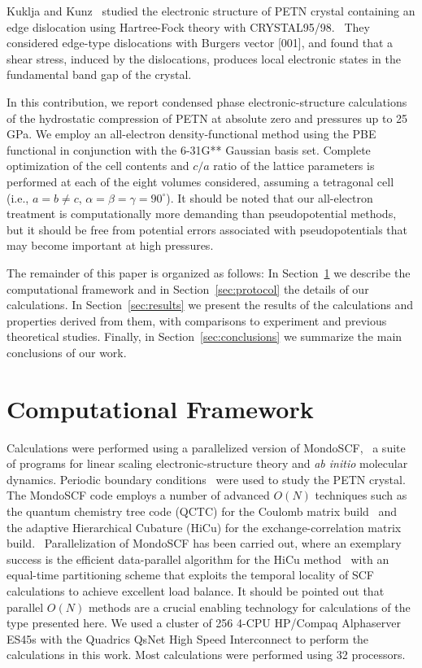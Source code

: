 \documentclass[prb,aps,nobibnotes,twocolumn,doublespace,twocolumngrid,superbib]{revtex4}
\begin{document}
Kuklja and Kunz~\cite{Kuklja_2001v89} studied the electronic structure 
of PETN crystal containing an edge dislocation using Hartree-Fock
theory with CRYSTAL95/98.~\cite{Crystal95} They considered
edge-type dislocations with Burgers vector [001], and 
found that a shear stress, induced by the dislocations, produces local 
electronic states in the fundamental band gap of the crystal.

In this contribution, we report condensed phase electronic-structure
calculations of the hydrostatic compression of PETN at absolute zero
and pressures up to 25 GPa.  We employ an all-electron
density-functional method using the PBE~\cite{Perdew_96v77} functional
in conjunction with the 6-31G** Gaussian basis set.  Complete
optimization of the cell contents and $c/a$ ratio of the lattice
parameters is performed at each of the eight volumes considered,
assuming a tetragonal cell (i.e., $a=b \neq c$,
$\alpha=\beta=\gamma=90^\circ$).  It should be noted that our
all-electron treatment is computationally more demanding than
pseudopotential methods, but it should be free from potential errors
associated with pseudopotentials that may become important at high
pressures.

The remainder of this paper is organized as follows: In
Section~\ref{sec:comput} we describe the computational framework and
in Section~\ref{sec:protocol} the details of our calculations. In
Section~\ref{sec:results} we present the results of the calculations
and properties derived from them, with comparisons to experiment and
previous theoretical studies.  Finally, in
Section~\ref{sec:conclusions} we summarize the main conclusions of our
work.

\section{Computational Framework}
\label{sec:comput}
Calculations were performed using a parallelized version of
MondoSCF,~\cite{MondoSCF} a suite of programs for linear scaling
electronic-structure theory and {\it ab initio} molecular dynamics.
Periodic boundary conditions~\cite{CTymczak03} were used to study the
PETN crystal.  The MondoSCF code employs a number of advanced $O(N)$
techniques such as the quantum chemistry tree code (QCTC) for the
Coulomb matrix
build~\cite{MChallacombe96,MChallacombe96B,MChallacombe97} and the
adaptive Hierarchical Cubature (HiCu) for the exchange-correlation
matrix build.~\cite{MChallacombe00A} Parallelization of MondoSCF has
been carried out, where an exemplary success is the efficient
data-parallel algorithm for the HiCu method~\cite{CGan03} with an
equal-time partitioning scheme that exploits the temporal locality of
SCF calculations to achieve excellent load balance.  It should be
pointed out that parallel $O(N)$ methods are a crucial enabling 
technology for calculations of the type presented here.  We used 
a cluster of 256 4-CPU HP/Compaq Alphaserver ES45s with the Quadrics 
QsNet High Speed Interconnect to perform the calculations in this work.  
Most calculations were performed using 32 processors.
\end{document}
